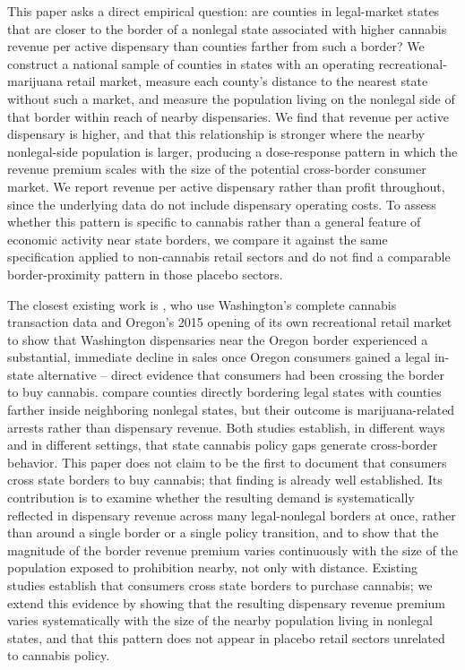 \documentclass[12pt]{article}
\begin{document}
This paper asks a direct empirical question: are counties in legal-market states that are closer to the
border of a nonlegal state associated with higher cannabis revenue per active dispensary than counties
farther from such a border? We construct a national sample of counties in states with an operating
recreational-marijuana retail market, measure each county's distance to the nearest state without such a
market, and measure the population living on the nonlegal side of that border within reach of nearby
dispensaries. We find that revenue per active dispensary is higher, and that this relationship is stronger
where the nearby nonlegal-side population is larger, producing a dose-response pattern in which the revenue
premium scales with the size of the potential cross-border consumer market. We report revenue per active
dispensary rather than profit throughout, since the underlying data do not include dispensary operating
costs. To assess whether this pattern is specific to cannabis rather than a general feature of economic
activity near state borders, we compare it against the same specification applied to non-cannabis retail
sectors and do not find a comparable border-proximity pattern in those placebo sectors.

The closest existing work is \citet{HansenMillerWeber2020}, who use Washington's complete cannabis
transaction data and Oregon's 2015 opening of its own recreational retail market to show that Washington
dispensaries near the Oregon border experienced a substantial, immediate decline in sales once Oregon
consumers gained a legal in-state alternative -- direct evidence that consumers had been crossing the
border to buy cannabis. \citet{HaoCowan2020} compare counties directly bordering legal states with counties
farther inside neighboring nonlegal states, but their outcome is marijuana-related arrests rather than
dispensary revenue. Both studies establish, in different ways and in different settings, that state
cannabis policy gaps generate cross-border behavior. This paper does not claim to be the first to document
that consumers cross state borders to buy cannabis; that finding is already well established. Its
contribution is to examine whether the resulting demand is systematically reflected in dispensary revenue
across many legal-nonlegal borders at once, rather than around a single border or a single policy
transition, and to show that the magnitude of the border revenue premium varies continuously with the size
of the population exposed to prohibition nearby, not only with distance. Existing studies establish that
consumers cross state borders to purchase cannabis; we extend this evidence by showing that the resulting
dispensary revenue premium varies systematically with the size of the nearby population living in nonlegal
states, and that this pattern does not appear in placebo retail sectors unrelated to cannabis policy.
\end{document}

